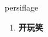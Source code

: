 
\begin{frame}
{\huge persiflage}
\begin{center}
\begin{enumerate}\Large
  \item \textbf{开玩笑}
\end{enumerate}
\end{center}
\end{frame}
